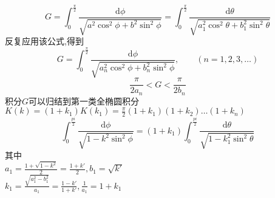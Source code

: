 \begin{equation}\label{key}
	G= \int_{0}^{\frac{\pi}{2}}\frac{\text{d}\phi}{\sqrt{a^2\cos^2\phi+b^2\sin^2\phi}}
	=\int_{0}^{\frac{\pi}{2}}\frac{\text{d}\theta}{\sqrt{a_1^2\cos^2\theta+b_1^2\sin^2\theta}}
\end{equation}
反复应用该公式,得到
\begin{equation}
		G= \int_{0}^{\frac{\pi}{2}}\frac{\text{d}\phi}{\sqrt{a_n^2\cos^2\phi+b_n^2\sin^2\phi}},\qquad(n=1,2,3,\dots)
\end{equation}
\begin{equation}
	\frac{\pi}{2a_n}<G<\frac{\pi}{2b_n}
\end{equation}
积分$ G $可以归结到第一类全椭圆积分 $ K(k) = (1+k_1)K(k_1) = \frac{\pi}{2}(1+k_1)(1+k_2)\dots(1+k_n) $
\begin{equation}\label{ellipIntI}
	\int_{0}^{\frac{pi}{2}}\frac{\text{d}\phi}{\sqrt{1-k^2\sin^2\phi}} 
	= (1+k_1)\int_{0}^{\frac{pi}{2}}\frac{\text{d}\theta}{\sqrt{1-k_1^2\sin^2\theta}}
\end{equation}
其中\\ 
$ a_1 = \frac{1+\sqrt{1-k^2}}{2} = \frac{1+k'}{2}, b_1 = \sqrt{k'} $\\
$ k_1 = \frac{\sqrt{a_1^2-b_1^2}}{a_1} = \frac{1-k'}{1+k'}, \frac{1}{a_1} = 1+k_1 $